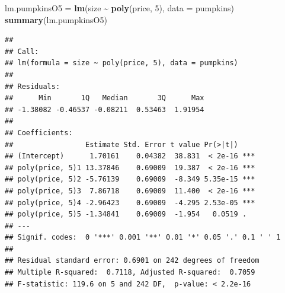\documentclass[
]{book}
\newenvironment{Shaded}{\begin{snugshade}}{\end{snugshade}}
\newcommand{\AttributeTok}[1]{\textcolor[rgb]{0.13,0.29,0.53}{#1}}
\newcommand{\DecValTok}[1]{\textcolor[rgb]{0.00,0.00,0.81}{#1}}
\newcommand{\FunctionTok}[1]{\textcolor[rgb]{0.13,0.29,0.53}{\textbf{#1}}}
\newcommand{\NormalTok}[1]{#1}
\newcommand{\OtherTok}[1]{\textcolor[rgb]{0.56,0.35,0.01}{#1}}
\newcommand{\SpecialCharTok}[1]{\textcolor[rgb]{0.81,0.36,0.00}{\textbf{#1}}}
\begin{document}
\begin{Shaded}
\begin{Highlighting}[]
\NormalTok{lm.pumpkinsO5 }\OtherTok{=} \FunctionTok{lm}\NormalTok{(size }\SpecialCharTok{\textasciitilde{}} \FunctionTok{poly}\NormalTok{(price, }\DecValTok{5}\NormalTok{), }\AttributeTok{data =}\NormalTok{ pumpkins)}
\FunctionTok{summary}\NormalTok{(lm.pumpkinsO5)}
\end{Highlighting}
\end{Shaded}

\begin{verbatim}
## 
## Call:
## lm(formula = size ~ poly(price, 5), data = pumpkins)
## 
## Residuals:
##      Min       1Q   Median       3Q      Max 
## -1.38082 -0.46537 -0.08211  0.53463  1.91954 
## 
## Coefficients:
##                 Estimate Std. Error t value Pr(>|t|)    
## (Intercept)      1.70161    0.04382  38.831  < 2e-16 ***
## poly(price, 5)1 13.37846    0.69009  19.387  < 2e-16 ***
## poly(price, 5)2 -5.76139    0.69009  -8.349 5.35e-15 ***
## poly(price, 5)3  7.86718    0.69009  11.400  < 2e-16 ***
## poly(price, 5)4 -2.96423    0.69009  -4.295 2.53e-05 ***
## poly(price, 5)5 -1.34841    0.69009  -1.954   0.0519 .  
## ---
## Signif. codes:  0 '***' 0.001 '**' 0.01 '*' 0.05 '.' 0.1 ' ' 1
## 
## Residual standard error: 0.6901 on 242 degrees of freedom
## Multiple R-squared:  0.7118, Adjusted R-squared:  0.7059 
## F-statistic: 119.6 on 5 and 242 DF,  p-value: < 2.2e-16
\end{verbatim}
\end{document}
